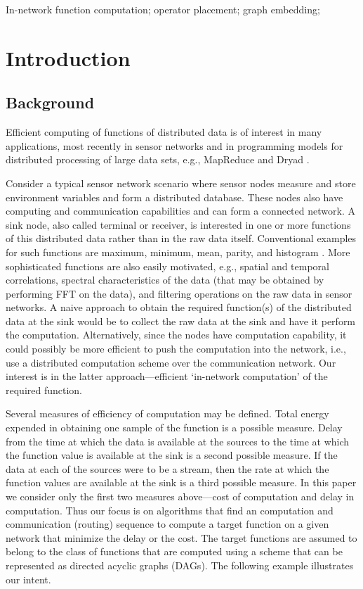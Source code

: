 \documentclass[journal]{IEEEtran}
\begin{document}
\begin{keywords}
  In-network function computation; operator placement; graph
  embedding;
\end{keywords}
\IEEEpeerreviewmaketitle

\section{Introduction}
\label{sec:intro} 

\subsection{Background}

Efficient computing of functions of distributed data is of interest in
many applications, most recently in sensor networks \cite{Giridhar05}
and in programming models for distributed processing of large data
sets, e.g., MapReduce \cite{Dean04} and Dryad \cite{Isard07}.

Consider a typical sensor network scenario where sensor nodes measure
and store environment variables and form a distributed database. These
nodes also have computing and communication capabilities and can form
a connected network. A sink node, also called terminal or receiver, is
interested in one or more functions of this distributed data rather
than in the raw data itself. Conventional examples for such functions
are maximum, minimum, mean, parity, and histogram
\cite{Giridhar05}. More sophisticated functions are also easily
motivated, e.g., spatial and temporal correlations, spectral
characteristics of the data (that may be obtained by performing FFT on
the data), and filtering operations on the raw data in sensor
networks. A naive approach to obtain the required function(s) of the
distributed data at the sink would be to collect the raw data at the
sink and have it perform the computation. Alternatively, since the
nodes have computation capability, it could possibly be more efficient
to push the computation into the network, i.e., use a distributed
computation scheme over the communication network.  Our interest is in
the latter approach---efficient `in-network computation' of the
required function.

Several measures of efficiency of computation may be defined. Total
energy expended in obtaining one sample of the function is a possible
measure. Delay from the time at which the data is available at the
sources to the time at which the function value is available at the
sink is a second possible measure. If the data at each of the sources
were to be a stream, then the rate at which the function values are
available at the sink is a third possible measure. In this paper we
consider only the first two measures above---cost of computation and
delay in computation. Thus our focus is on algorithms that find an
computation and communication (routing) sequence to compute a target
function on a given network that minimize the delay or the cost.  The
target functions are assumed to belong to the class of functions that
are computed using a scheme that can be represented as directed
acyclic graphs (DAGs). The following example illustrates our intent.
\end{document}
